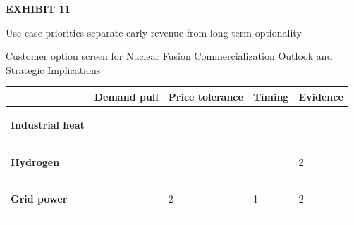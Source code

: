 \documentclass[10pt,a4paper]{article}
\begin{document}
\clearpage
{\textcolor{BOGreen}{\scriptsize\bfseries EXHIBIT 11}}\par\vspace{4pt}
{\sffamily\fontsize{17}{21}\selectfont\color{BONavy} Use-case priorities separate early revenue from long-term optionality}\par
{\small\color{BOText} Customer option screen for Nuclear Fusion Commercialization Outlook and Strategic Implications}\par\vspace{6pt}
{\scriptsize\begin{tabular}{p{38mm}>{\centering\arraybackslash}p{21mm}>{\centering\arraybackslash}p{21mm}>{\centering\arraybackslash}p{21mm}>{\centering\arraybackslash}p{21mm}}
 & {\bfseries Demand pull} & {\bfseries Price tolerance} & {\bfseries Timing} & {\bfseries Evidence} \\
\hline
{\bfseries Industrial heat} & \colorbox{BOGreen}{\textcolor{white}{\strut\hspace{5pt}5\hspace{5pt}}} & \colorbox{BOGreen}{\textcolor{white}{\strut\hspace{5pt}4\hspace{5pt}}} & \colorbox{BOBlue}{\textcolor{white}{\strut\hspace{5pt}3\hspace{5pt}}} & \colorbox{BOBlue}{\textcolor{white}{\strut\hspace{5pt}3\hspace{5pt}}} \\
{\bfseries Hydrogen} & \colorbox{BOGreen}{\textcolor{white}{\strut\hspace{5pt}4\hspace{5pt}}} & \colorbox{BOGreen}{\textcolor{white}{\strut\hspace{5pt}4\hspace{5pt}}} & \colorbox{BOBlue}{\textcolor{white}{\strut\hspace{5pt}3\hspace{5pt}}} & \colorbox{BOLight}{\textcolor{BOText}{\strut\hspace{5pt}2\hspace{5pt}}} \\
{\bfseries Grid power} & \colorbox{BOGreen}{\textcolor{white}{\strut\hspace{5pt}5\hspace{5pt}}} & \colorbox{BOLight}{\textcolor{BOText}{\strut\hspace{5pt}2\hspace{5pt}}} & \colorbox{BOLight}{\textcolor{BOText}{\strut\hspace{5pt}1\hspace{5pt}}} & \colorbox{BOLight}{\textcolor{BOText}{\strut\hspace{5pt}2\hspace{5pt}}} \\

\end{tabular}}
\end{document}
